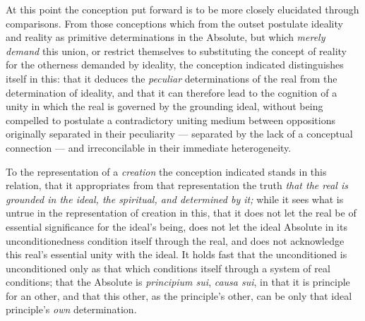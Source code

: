 \documentclass[12pt,a4paper]{book}
\begin{document}
At this point the conception put forward is to be more closely elucidated
through comparisons. From those conceptions which from the outset postulate
ideality and reality as primitive determinations in the Absolute, but which
\emph{merely demand} this union, or restrict themselves to substituting the
concept of reality for the otherness demanded by ideality, the conception
indicated distinguishes itself in this: that it deduces the \emph{peculiar}
determinations of the real from the determination of ideality, and that it can
therefore lead to the cognition of a unity in which the real is governed by
the grounding ideal, without being compelled to postulate a contradictory
uniting medium between oppositions originally separated in their peculiarity
--- separated by the lack of a conceptual connection --- and irreconcilable in
their immediate heterogeneity.

To the representation of a \emph{creation} the conception indicated stands in
this relation, that it appropriates from that representation the truth
\emph{that the real is grounded in the ideal, the spiritual, and determined by
it;} while it sees what is untrue in the representation of creation in this,
that it does not let the real be of essential significance for the ideal's
being, does not let the ideal Absolute in its unconditionedness condition
itself through the real, and does not acknowledge this real's essential unity
with the ideal. It holds fast that the unconditioned is unconditioned only as
that which conditions itself through a system of real conditions; that the
Absolute is \textit{principium sui}, \textit{causa sui}, in that it is
principle for an other, and that this other, as the principle's other, can be
only that ideal principle's \emph{own} determination.
\end{document}
